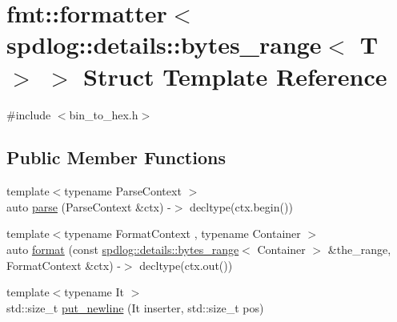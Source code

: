 \hypertarget{structfmt_1_1formatter_3_01spdlog_1_1details_1_1bytes__range_3_01_t_01_4_01_4}{}\section{fmt\+:\+:formatter$<$ spdlog\+:\+:details\+:\+:bytes\+\_\+range$<$ T $>$ $>$ Struct Template Reference}
\label{structfmt_1_1formatter_3_01spdlog_1_1details_1_1bytes__range_3_01_t_01_4_01_4}


{\ttfamily \#include $<$bin\+\_\+to\+\_\+hex.\+h$>$}

\subsection*{Public Member Functions}
\begin{DoxyCompactItemize}
\item 
{\footnotesize template$<$typename Parse\+Context $>$ }\\auto \hyperlink{structfmt_1_1formatter_3_01spdlog_1_1details_1_1bytes__range_3_01_t_01_4_01_4_ada366ec2d0f00fa94560551fdbbbb640}{parse} (Parse\+Context \&ctx) -\/$>$ decltype(ctx.\+begin())
\item 
{\footnotesize template$<$typename Format\+Context , typename Container $>$ }\\auto \hyperlink{structfmt_1_1formatter_3_01spdlog_1_1details_1_1bytes__range_3_01_t_01_4_01_4_a23665231993cdeb323a86ecb9a7a63a1}{format} (const \hyperlink{classspdlog_1_1details_1_1bytes__range}{spdlog\+::details\+::bytes\+\_\+range}$<$ Container $>$ \&the\+\_\+range, Format\+Context \&ctx) -\/$>$ decltype(ctx.\+out())
\item 
{\footnotesize template$<$typename It $>$ }\\std\+::size\+\_\+t \hyperlink{structfmt_1_1formatter_3_01spdlog_1_1details_1_1bytes__range_3_01_t_01_4_01_4_ae001a71b76b4a56f722a7b91c506e9bf}{put\+\_\+newline} (It inserter, std\+::size\+\_\+t pos)
\end{DoxyCompactItemize}
